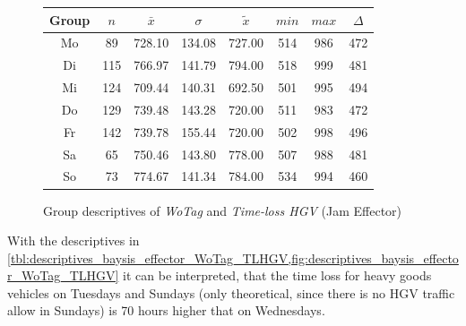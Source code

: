 \begin{figure}[ht!]
	\centering
	\begin{minipage}{0.5\textwidth}
		\tiny
		\setlength{\tabcolsep}{4pt}
		\centering
		\begin{tabular}{c|c|c|c|c|c|c|c}
			\toprule
			Group & $n$ & $\bar{x}$ & $\sigma$ & $\tilde{x}$ & $min$ & $max$ & $\Delta$ \\
			\midrule
			Mo & 89  & 728.10 & 134.08 & 727.00 & 514 & 986 & 472 \\ 
			Di & 115 & 766.97 & 141.79 & 794.00 & 518 & 999 & 481 \\ 
			Mi & 124 & 709.44 & 140.31 & 692.50 & 501 & 995 & 494 \\ 
			Do & 129 & 739.48 & 143.28 & 720.00 & 511 & 983 & 472 \\ 
			Fr & 142 & 739.78 & 155.44 & 720.00 & 502 & 998 & 496 \\ 
			Sa & 65  & 750.46 & 143.80 & 778.00 & 507 & 988 & 481 \\ 
			So & 73  & 774.67 & 141.34 & 784.00 & 534 & 994 & 460 \\ 
			\bottomrule
		\end{tabular}
		\label{tbl:descriptives_baysis_effector_WoTag_TLHGV}
	\end{minipage}%
	\begin{minipage}{0.55\textwidth}
		\tiny
		\centering
		\vfill
		\label{fig:descriptives_baysis_effector_WoTag_TLHGV}
	\end{minipage}%
	\caption{Group descriptives of \textit{WoTag} and \textit{Time-loss HGV} (Jam Effector)}
\end{figure}
With the descriptives in \cref{tbl:descriptives_baysis_effector_WoTag_TLHGV,fig:descriptives_baysis_effector_WoTag_TLHGV} it can be interpreted, that the time loss for heavy goods vehicles on Tuesdays and Sundays (only theoretical, since there is no HGV traffic allow in Sundays) is 70 hours higher that on Wednesdays.

